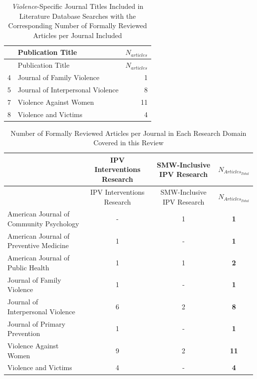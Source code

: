 \documentclass[11pt,]{tufte-book}
\begin{document}
\newpage

\begin{longtable}[]{@{}llr@{}}
\caption{\emph{Violence}-Specific Journal Titles Included in Literature
Database Searches with the Corresponding Number of Formally Reviewed
Articles per Journal Included \label{tbl:jv}}\tabularnewline
\toprule
& Publication Title & \(N_{articles}\)\tabularnewline
\midrule
\endfirsthead
\toprule
& Publication Title & \(N_{articles}\)\tabularnewline
\midrule
\endhead
4 & Journal of Family Violence & 1\tabularnewline
5 & Journal of Interpersonal Violence & 8\tabularnewline
7 & Violence Against Women & 11\tabularnewline
8 & Violence and Victims & 4\tabularnewline
\bottomrule
\end{longtable}

\newpage

\begin{longtable}[]{@{}lccc@{}}
\caption{Number of Formally Reviewed Articles per Journal in Each
Research Domain Covered in this Review \label{tbl:jsft}}\tabularnewline
\toprule
& IPV Interventions Research & SMW-Inclusive IPV Research &
\(N_{Articles_{Total}}\)\tabularnewline
\midrule
\endfirsthead
\toprule
& IPV Interventions Research & SMW-Inclusive IPV Research &
\(N_{Articles_{Total}}\)\tabularnewline
\midrule
\endhead
American Journal of Community Psychology & - & 1 &
\textbf{1}\tabularnewline
American Journal of Preventive Medicine & 1 & - &
\textbf{1}\tabularnewline
American Journal of Public Health & 1 & 1 & \textbf{2}\tabularnewline
Journal of Family Violence & 1 & - & \textbf{1}\tabularnewline
Journal of Interpersonal Violence & 6 & 2 & \textbf{8}\tabularnewline
Journal of Primary Prevention & 1 & - & \textbf{1}\tabularnewline
Violence Against Women & 9 & 2 & \textbf{11}\tabularnewline
Violence and Victims & 4 & - & \textbf{4}\tabularnewline
\bottomrule
\end{longtable}

\newpage
\end{document}

